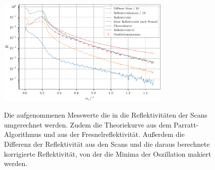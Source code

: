 \\\\
\begin{figure}
    \centering
    \caption{Die aufgenommenen Messwerte die in die Reflektivitäten der Scans umgerechnet werden. Zudem die Theoriekurve aus dem Parratt-Algorithmus und aus der Fresnelreflektivität.
    Außerdem die Differenz der Reflektivität aus den Scans und die daraus berechnete korrigierte Reflektivität, von der die Minima der Oszillation makiert werden.}
    \includegraphics[width=0.75\textwidth]{content/data/reflek.pdf}
    \label{fig:reflek}
\end{figure}
\FloatBarrier